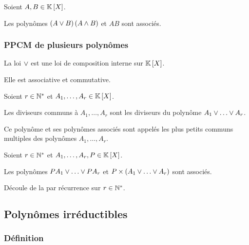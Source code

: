 \begin{prop}
Soient \(A,B\in\poly\).

Les polynômes \(\left(A\lor B\right)\left(A\land B\right)\) et \(AB\) sont associés.
\end{prop}

\begin{dem}
\end{dem}

\subsubsection{PPCM de plusieurs polynômes}

\begin{prop}
La loi \(\lor\) est une loi de composition interne sur \(\poly\).

Elle est associative et commutative.
\end{prop}

\begin{dem}
\end{dem}

\begin{defprop}
Soient \(r\in\mathbb{N}^*\) et \(A_1,\dots,A_r\in\poly\).

Les diviseurs communs à \(A_1,\dots,A_r\) sont les diviseurs du polynôme \(A_1\ou\dots\ou A_r\).

Ce polynôme et ses polynômes associés sont appelés les plus petits communs multiples des polynômes \(A_1,\dots,A_r\).
\end{defprop}

\begin{dem}
\end{dem}

\begin{prop}
Soient \(r\in\mathbb{N}^*\) et \(A_1,\dots,A_r,P\in\poly\).

Les polynômes \(PA_1\ou\dots\ou PA_r\) et \(P\times\paren{A_1\ou\dots\ou A_r}\) sont associés.
\end{prop}

\begin{dem}
Découle de la  par récurrence sur \(r\in\mathbb{N}^*\).
\end{dem}

\subsection{Polynômes irréductibles}

\subsubsection{Définition}

